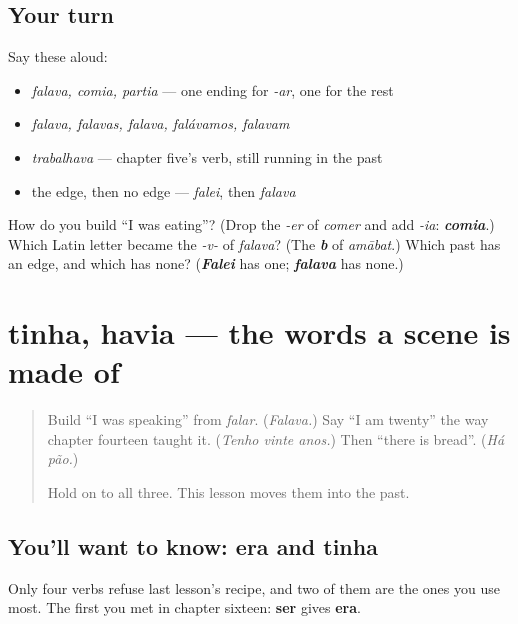 \subsection*{Your turn}
Say these aloud:

\begin{itemize}
\raggedright
  \item \emph{falava, comia, partia} — one ending for \emph{-ar}, one for the rest
  \item \emph{falava, falavas, falava, falávamos, falavam}
  \item \emph{trabalhava} — chapter five's verb, still running in the past
  \item the edge, then no edge — \emph{falei}, then \emph{falava}
\end{itemize}

\begin{tcolorbox}[breakable,colback=teal!4,colframe=teal!35!black,title={Before you move on}]
How do you build \textquotedblleft{}I was eating\textquotedblright{}? (Drop the \emph{-er} of \emph{comer} and add \emph{-ia}: \emph{\textbf{comia}}.) Which Latin letter became the \emph{-v-} of \emph{falava}? (The \emph{\textbf{b}} of \emph{amābat}.) Which past has an edge, and which has none? (\emph{\textbf{Falei}} has one; \emph{\textbf{falava}} has none.)
\end{tcolorbox}
\section[tinha, havia]{tinha, havia — the words a scene is made of}

\label{lesson:PT-C259-tinha-havia}



\begin{quote}
Build \textquotedblleft{}I was speaking\textquotedblright{} from \emph{falar}. (\emph{Falava.}) Say \textquotedblleft{}I am twenty\textquotedblright{} the way chapter fourteen taught it. (\emph{Tenho vinte anos.}) Then \textquotedblleft{}there is bread\textquotedblright{}. (\emph{Há pão.})

Hold on to all three. This lesson moves them into the past.
\end{quote}

\subsection*{You'll want to know: era and tinha}
Only four verbs refuse last lesson's recipe, and two of them are the ones you use most. The first you met in chapter sixteen: \textbf{ser} gives \textbf{era}.


